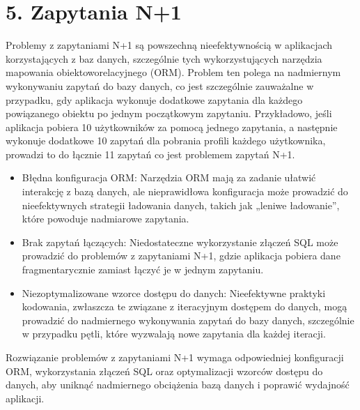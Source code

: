 \documentclass[letterpaper,10pt,polish]{sphinxmanual}
\begin{document}
\section{5. Zapytania N+1}
\label{\detokenize{rozdzialy/rozdzial3:zapytania-n-1}}
\sphinxAtStartPar
Problemy z zapytaniami N+1 są powszechną nieefektywnością w aplikacjach korzystających z baz danych, szczególnie tych wykorzystujących narzędzia mapowania obiektowo\sphinxhyphen{}relacyjnego (ORM). Problem ten polega na nadmiernym wykonywaniu zapytań do bazy danych, co jest szczególnie zauważalne w przypadku, gdy aplikacja wykonuje dodatkowe zapytania dla każdego powiązanego obiektu po jednym początkowym zapytaniu. Przykładowo, jeśli aplikacja pobiera 10 użytkowników za pomocą jednego zapytania, a następnie wykonuje dodatkowe 10 zapytań dla pobrania profili każdego użytkownika, prowadzi to do łącznie 11 zapytań \sphinxhyphen{} co jest problemem zapytań N+1.
\begin{description}
\begin{itemize}
\item {} 
\sphinxAtStartPar
Błędna konfiguracja ORM: Narzędzia ORM mają za zadanie ułatwić interakcję z bazą danych, ale nieprawidłowa konfiguracja może prowadzić do nieefektywnych strategii ładowania danych, takich jak „leniwe ładowanie”, które powoduje nadmiarowe zapytania.

\item {} 
\sphinxAtStartPar
Brak zapytań łączących: Niedostateczne wykorzystanie złączeń SQL może prowadzić do problemów z zapytaniami N+1, gdzie aplikacja pobiera dane fragmentarycznie zamiast łączyć je w jednym zapytaniu.

\item {} 
\sphinxAtStartPar
Niezoptymalizowane wzorce dostępu do danych: Nieefektywne praktyki kodowania, zwłaszcza te związane z iteracyjnym dostępem do danych, mogą prowadzić do nadmiernego wykonywania zapytań do bazy danych, szczególnie w przypadku pętli, które wyzwalają nowe zapytania dla każdej iteracji.

\end{itemize}

\end{description}

\sphinxAtStartPar
Rozwiązanie problemów z zapytaniami N+1 wymaga odpowiedniej konfiguracji ORM, wykorzystania złączeń SQL oraz optymalizacji wzorców dostępu do danych, aby uniknąć nadmiernego obciążenia bazą danych i poprawić wydajność aplikacji.
\end{document}
